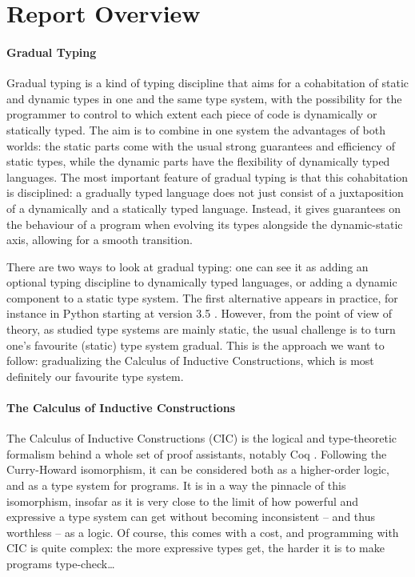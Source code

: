 \documentclass{kaobook}
\DeclareMathOperator{\?}{?}
\begin{document}
{\tableofcontents

\section*{Report Overview}


\paragraph{Gradual Typing}
Gradual typing is a kind of typing discipline that aims for a cohabitation of static and dynamic types in one and the same type system, with the possibility for the programmer to control to which extent each piece of code is dynamically or statically typed. The aim is to combine in one system the advantages of both worlds: the static parts come with the usual strong guarantees and efficiency of static types, while the dynamic parts have the flexibility of dynamically typed languages. The most important feature of gradual typing is that this cohabitation is disciplined: a gradually typed language does not just consist of a juxtaposition of a dynamically and a statically typed language. Instead, it gives guarantees on the behaviour of a program when evolving its types alongside the dynamic-static axis, allowing for a smooth transition.

There are two ways to look at gradual typing: one can see it as adding an optional typing discipline to dynamically typed languages, or adding a dynamic component to a static type system. The first alternative appears in practice, for instance in Python starting at version 3.5 \cite{Rossum2014}. However, from the point of view of theory, as studied type systems are mainly static, the usual challenge is to turn one's favourite (static) type system gradual. This is the approach we want to follow: gradualizing the Calculus of Inductive Constructions, which is most definitely our favourite type system.

\paragraph{The Calculus of Inductive Constructions}
The Calculus of Inductive Constructions (CIC) is the logical and type-theoretic formalism behind a whole set of proof assistants, notably Coq \cite{CoqMan}. Following the Curry-Howard isomorphism, it can be considered both as a higher-order logic, and as a type system for programs. It is in a way the pinnacle of this isomorphism, insofar as it is very close to the limit of how powerful and expressive a type system can get without becoming inconsistent – and thus worthless – as a logic. Of course, this comes with a cost, and programming with CIC is quite complex: the more expressive types get, the harder it is to make programs type-check…

}
\end{document}

